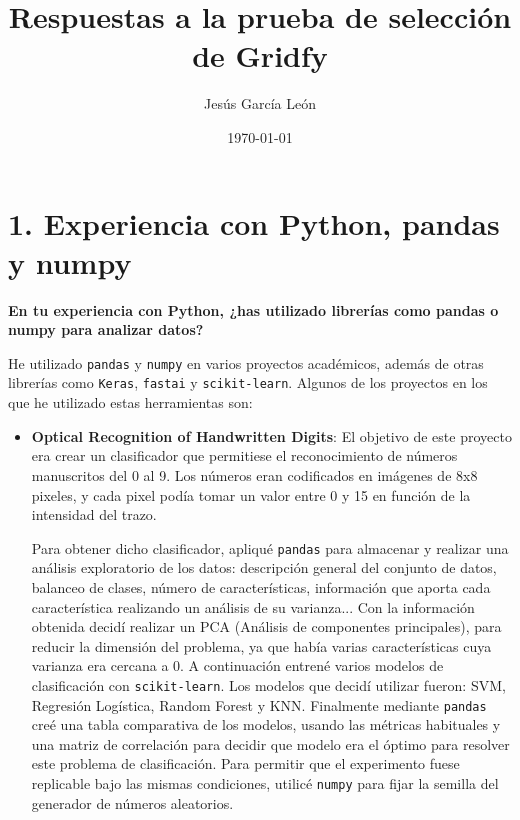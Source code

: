 \documentclass[12pt,a4paper]{article}
\title{Respuestas a la prueba de selección de Gridfy}
\author{Jesús García León}
\date{\today}
\begin{document}
\maketitle

\section*{1. Experiencia con Python, pandas y numpy}
\textbf{En tu experiencia con Python, ¿has utilizado librerías como pandas o numpy para analizar datos?}

He utilizado \texttt{pandas} y \texttt{numpy} en varios proyectos académicos, además de otras librerías como \texttt{Keras},  \texttt{fastai} y \texttt{scikit-learn}. Algunos de los proyectos en los que he utilizado estas herramientas son:

\begin{itemize}
   
    \item \textbf{Optical Recognition of Handwritten Digits}: 
El objetivo de este proyecto era crear un clasificador que permitiese el reconocimiento de números manuscritos del 0 al 9. Los números eran codificados en imágenes de 8x8 pixeles, y  cada pixel podía tomar un valor entre 0 y 15 en función de la intensidad del trazo.

Para obtener dicho clasificador, apliqué \texttt{pandas} para almacenar y realizar una análisis exploratorio de los datos: descripción general del conjunto de datos, balanceo de clases, número de características, información que aporta cada característica realizando un análisis de su varianza... Con la información obtenida decidí realizar un PCA (Análisis de componentes principales), para reducir la dimensión del problema, ya que había varias características cuya varianza era cercana a 0. A continuación entrené varios modelos de clasificación con \texttt{scikit-learn}. Los modelos que decidí utilizar fueron: SVM, Regresión Logística, Random Forest y KNN. Finalmente mediante \texttt{pandas} creé una tabla comparativa de los modelos, usando las métricas habituales y una matriz de correlación para decidir que modelo era el óptimo para resolver este problema de clasificación. Para permitir que el experimento fuese replicable bajo las mismas condiciones, utilicé \texttt{numpy} para fijar la semilla del generador de números aleatorios.
    

\end{itemize}
\end{document}
